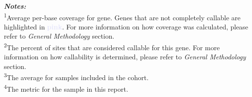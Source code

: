 \textbf{\textit{Notes:}}
\\
\textsuperscript{1}Average per-base coverage for gene. Genes that are not completely callable are highlighted in \textbf{\textcolor{Lavender}{pink}}. For more information on how coverage was calculated, please refer to \textit{General Methodology} section.
\\
\textsuperscript{2}The percent of sites that are considered callable for this gene. For more information on how callability is determined, please refer to \textit{General Methodology} section.
\\
\textsuperscript{3}The average for samples included in the cohort.
\\
\textsuperscript{4}The metric for the sample in this report.
\\
\newpage
